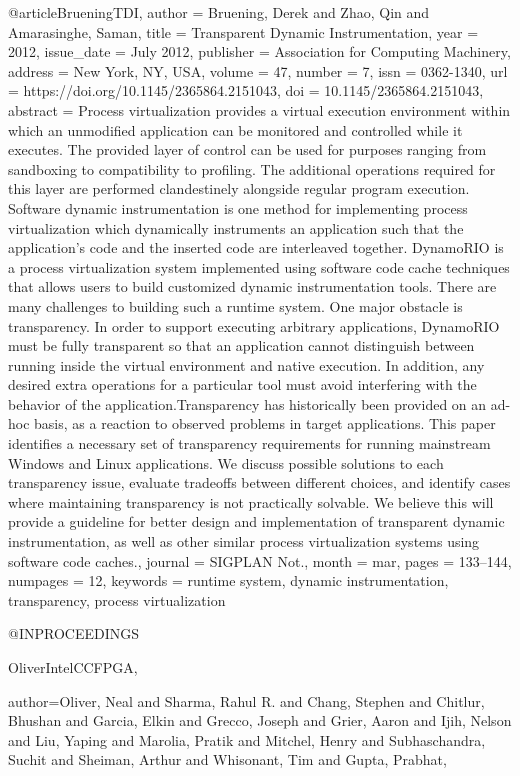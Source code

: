 {@article{BrueningTDI,
author = {Bruening, Derek and Zhao, Qin and Amarasinghe, Saman},
title = {Transparent Dynamic Instrumentation},
year = {2012},
issue_date = {July 2012},
publisher = {Association for Computing Machinery},
address = {New York, NY, USA},
volume = {47},
number = {7},
issn = {0362-1340},
url = {https://doi.org/10.1145/2365864.2151043},
doi = {10.1145/2365864.2151043},
abstract = {Process virtualization provides a virtual execution environment within which an unmodified application can be monitored and controlled while it executes. The provided layer of control can be used for purposes ranging from sandboxing to compatibility to profiling. The additional operations required for this layer are performed clandestinely alongside regular program execution. Software dynamic instrumentation is one method for implementing process virtualization which dynamically instruments an application such that the application's code and the inserted code are interleaved together. DynamoRIO is a process virtualization system implemented using software code cache techniques that allows users to build customized dynamic instrumentation tools. There are many challenges to building such a runtime system. One major obstacle is transparency. In order to support executing arbitrary applications, DynamoRIO must be fully transparent so that an application cannot distinguish between running inside the virtual environment and native execution. In addition, any desired extra operations for a particular tool must avoid interfering with the behavior of the application.Transparency has historically been provided on an ad-hoc basis, as a reaction to observed problems in target applications. This paper identifies a necessary set of transparency requirements for running mainstream Windows and Linux applications. We discuss possible solutions to each transparency issue, evaluate tradeoffs between different choices, and identify cases where maintaining transparency is not practically solvable. We believe this will provide a guideline for better design and implementation of transparent dynamic instrumentation, as well as other similar process virtualization systems using software code caches.},
journal = {SIGPLAN Not.},
month = {mar},
pages = {133–144},
numpages = {12},
keywords = {runtime system, dynamic instrumentation, transparency, process virtualization}
}


@INPROCEEDINGS{OliverIntelCCFPGA,

  author={Oliver, Neal and Sharma, Rahul R. and Chang, Stephen and Chitlur, Bhushan and Garcia, Elkin and Grecco, Joseph and Grier, Aaron and Ijih, Nelson and Liu, Yaping and Marolia, Pratik and Mitchel, Henry and Subhaschandra, Suchit and Sheiman, Arthur and Whisonant, Tim and Gupta, Prabhat},

}}
